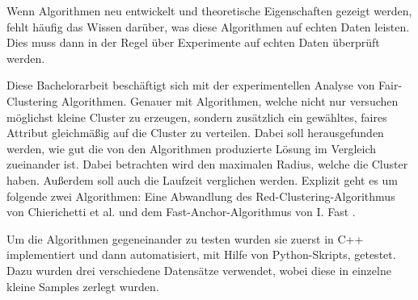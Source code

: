 \begin{center} 
    \huge {}
\end{center}

Wenn Algorithmen neu entwickelt und theoretische Eigenschaften gezeigt werden, fehlt häufig das Wissen darüber, was diese Algorithmen auf echten Daten leisten. Dies muss dann in der Regel über Experimente auf echten Daten überprüft werden. 

Diese Bachelorarbeit beschäftigt sich mit der experimentellen Analyse von Fair-Clustering Algorithmen. Genauer mit Algorithmen, welche nicht nur versuchen möglichst kleine Cluster zu erzeugen, sondern zusätzlich ein gewähltes, faires Attribut gleichmäßig auf die Cluster zu verteilen. Dabei soll herausgefunden werden, wie gut die von den Algorithmen produzierte Lösung im Vergleich zueinander ist. Dabei betrachten wird den maximalen Radius, welche die Cluster haben. Außerdem soll auch die Laufzeit verglichen werden.
Explizit geht es um folgende zwei Algorithmen: Eine Abwandlung des Red-Clustering-Algorithmus von Chierichetti et al. \cite{chierichetti2018fair} und dem Fast-Anchor-Algorithmus von I. Fast \cite{BA_Clustering_Irina}.

Um die Algorithmen gegeneinander zu testen wurden sie zuerst in C++ implementiert und dann automatisiert, mit Hilfe von Python-Skripts, getestet. Dazu wurden drei verschiedene Datensätze verwendet, wobei diese in einzelne kleine Samples zerlegt wurden.


